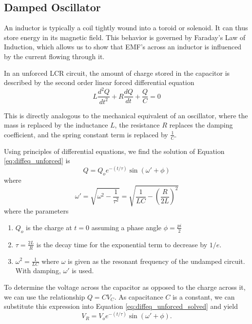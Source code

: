 \documentclass[12pt]{article}
\newcommand{\paren}[1]{\left( {#1} \right)}
\begin{document}
\subsection{Damped Oscillator}
An inductor is typically a coil tightly wound into a toroid or solenoid. It can thus store energy in its magnetic field. This behavior is governed by Faraday's Law of Induction, which allows us to show that EMF's across an inductor is influenced by the current flowing through it.  

In an unforced LCR circuit, the amount of charge stored in the capacitor is described by the second order linear forced differential equation
\begin{equation}
	L\frac{d^2Q}{dt^2}+R\frac{dQ}{dt}+\frac{Q}{C}=0 \label{eq:diffeq_unforced}
\end{equation}

This is directly analogous to the mechanical equivalent of an oscillator, where the mass is replaced by the inductance $L$, the resistance $R$ replaces the damping coefficient, and the spring constant term is replaced by $\frac{1}{C}$.

Using principles of differential equations, we find the solution of Equation \ref{eq:diffeq_unforced} is
\begin{equation}
	Q=Q_oe^{-(t/\tau)}\sin\paren{\omega'+\phi} \label{eq:diffeq_unforced_solved}
\end{equation}
where
\begin{equation}
	\omega'=\sqrt{\omega^2-\frac{1}{\tau^2}}=\sqrt{\frac{1}{LC}-\paren{\frac{R}{2L}}^2}
\end{equation}
where the parameters
\begin{enumerate}
	\item $Q_o$ is the charge at $t=0$ assuming a phase angle $\phi=\frac{pi}{2}$
	\item $\tau=\frac{2L}{R}$ is the decay time for the exponential term to decrease by $1/e$.
	\item $\omega^2=\frac{1}{LC}$ where $\omega$ is given as the resonant frequency of the undamped circuit. With damping, $\omega'$ is used.
\end{enumerate}

To determine the voltage across the capacitor as opposed to the charge across it, we can use the relationship $Q=CV_C$. As capacitance $C$ is a constant, we can substitute this expression into Equation \ref{eq:diffeq_unforced_solved} and yield
\begin{equation}
	V_R=V_oe^{-(t/\tau)}\sin\paren{\omega'+\phi}. \label{eq:diffeq_unforced_solved_with_V}
\end{equation}
\end{document}
